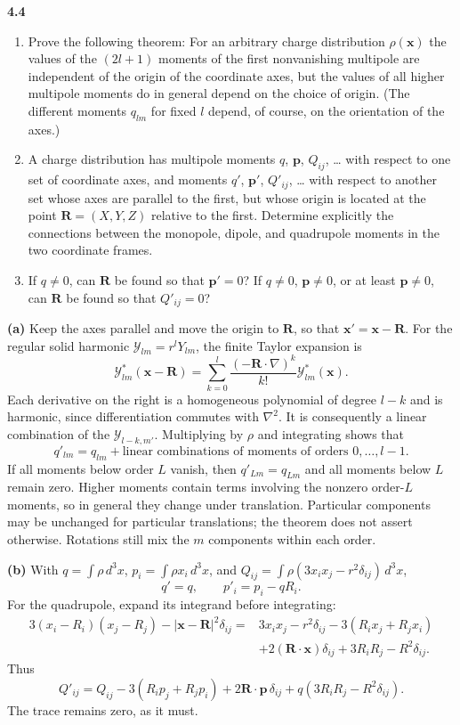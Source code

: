 \par\bigskip
\noindent\textbf{4.4}\quad\begin{enumerate}
\item[(a)] Prove the following theorem: For an arbitrary charge distribution $\rho(\mathbf{x})$ the values of the $(2l+1)$ moments of the first nonvanishing multipole are independent of the origin of the coordinate axes, but the values of all higher multipole moments do in general depend on the choice of origin. (The different moments $q_{lm}$ for fixed $l$ depend, of course, on the orientation of the axes.)
\item[(b)] A charge distribution has multipole moments $q$, $\mathbf{p}$, $Q_{ij}$, \ldots{} with respect to one set of coordinate axes, and moments $q'$, $\mathbf{p}'$, $Q'_{ij}$, \ldots{} with respect to another set whose axes are parallel to the first, but whose origin is located at the point $\mathbf{R}=(X,Y,Z)$ relative to the first. Determine explicitly the connections between the monopole, dipole, and quadrupole moments in the two coordinate frames.
\item[(c)] If $q\neq0$, can $\mathbf{R}$ be found so that $\mathbf{p}'=0$? If $q\neq0$, $\mathbf{p}\neq0$, or at least $\mathbf{p}\neq0$, can $\mathbf{R}$ be found so that $Q'_{ij}=0$?
\end{enumerate}
\solution

\textbf{(a)} Keep the axes parallel and move the origin to $\mathbf R$,
so that $\mathbf x'=\mathbf x-\mathbf R$. For the regular solid harmonic
$\mathcal Y_{lm}=r^lY_{lm}$, the finite Taylor expansion is
\[
\mathcal Y_{lm}^{*}(\mathbf x-\mathbf R)
=\sum_{k=0}^l\frac{(-\mathbf R\cdot\nabla)^k}{k!}
\mathcal Y_{lm}^{*}(\mathbf x).
\]
Each derivative on the right is a homogeneous polynomial of degree
$l-k$ and is harmonic, since differentiation commutes with $\nabla^2$.
It is consequently a linear combination of the $\mathcal Y_{l-k,m'}$.
Multiplying by $\rho$ and integrating shows that
\[
q'_{lm}=q_{lm}+\text{linear combinations of moments of orders }0,\ldots,l-1.
\]
If all moments below order $L$ vanish, then $q'_{Lm}=q_{Lm}$ and all
moments below $L$ remain zero. Higher moments contain terms involving
the nonzero order-$L$ moments, so in general they change under
translation. Particular components may be unchanged for particular
translations; the theorem does not assert otherwise. Rotations still
mix the $m$ components within each order.

\textbf{(b)} With $q=\int\rho\,d^3x$, $p_i=\int\rho x_i\,d^3x$, and
$Q_{ij}=\int\rho(3x_ix_j-r^2\delta_{ij})\,d^3x$,
\[
\boxed{q'=q,\qquad p'_i=p_i-qR_i.}
\]
For the quadrupole, expand its integrand before integrating:
\begin{align*}
3(x_i-R_i)(x_j-R_j)-|\mathbf x-\mathbf R|^2\delta_{ij}
={}&3x_ix_j-r^2\delta_{ij}-3(R_ix_j+R_jx_i)\\
&+2(\mathbf R\cdot\mathbf x)\delta_{ij}
+3R_iR_j-R^2\delta_{ij}.
\end{align*}
Thus
\[
\boxed{Q'_{ij}=Q_{ij}-3(R_ip_j+R_jp_i)
+2\mathbf R\cdot\mathbf p\,\delta_{ij}
+q(3R_iR_j-R^2\delta_{ij}).}
\]
The trace remains zero, as it must.

